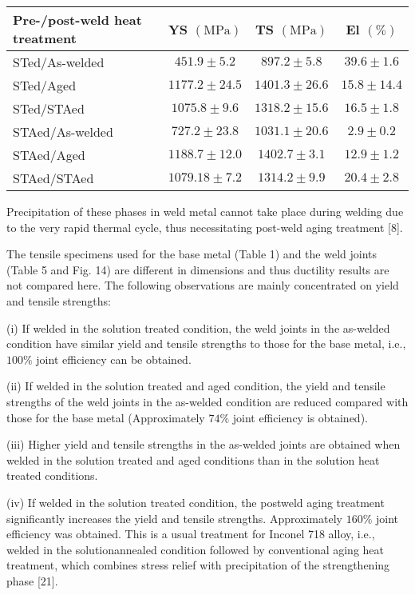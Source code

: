 \documentclass[10pt]{article}
\begin{document}
\begin{center}
\begin{tabular}{lccc}
\hline
Pre-/post-weld heat treatment & YS $(\mathrm{MPa})$ & TS $(\mathrm{MPa})$ & El $(\%)$ \\
\hline
STed/As-welded & $451.9 \pm 5.2$ & $897.2 \pm 5.8$ & $39.6 \pm 1.6$ \\
STed/Aged & $1177.2 \pm 24.5$ & $1401.3 \pm 26.6$ & $15.8 \pm 14.4$ \\
STed/STAed & $1075.8 \pm 9.6$ & $1318.2 \pm 15.6$ & $16.5 \pm 1.8$ \\
STAed/As-welded & $727.2 \pm 23.8$ & $1031.1 \pm 20.6$ & $2.9 \pm 0.2$ \\
STAed/Aged & $1188.7 \pm 12.0$ & $1402.7 \pm 3.1$ & $12.9 \pm 1.2$ \\
STAed/STAed & $1079.18 \pm 7.2$ & $1314.2 \pm 9.9$ & $20.4 \pm 2.8$ \\
\hline
\end{tabular}
\end{center}

Precipitation of these phases in weld metal cannot take place during welding due to the very rapid thermal cycle, thus necessitating post-weld aging treatment [8].

The tensile specimens used for the base metal (Table 1) and the weld joints (Table 5 and Fig. 14) are different in dimensions and thus ductility results are not compared here. The following observations are mainly concentrated on yield and tensile strengths:

(i) If welded in the solution treated condition, the weld joints in the as-welded condition have similar yield and tensile strengths to those for the base metal, i.e., $100 \%$ joint efficiency can be obtained.

(ii) If welded in the solution treated and aged condition, the yield and tensile strengths of the weld joints in the as-welded condition are reduced compared with those for the base metal (Approximately $74 \%$ joint efficiency is obtained).

(iii) Higher yield and tensile strengths in the as-welded joints are obtained when welded in the solution treated and aged conditions than in the solution heat treated conditions.

(iv) If welded in the solution treated condition, the postweld aging treatment significantly increases the yield and tensile strengths. Approximately $160 \%$ joint efficiency was obtained. This is a usual treatment for Inconel 718 alloy, i.e., welded in the solutionannealed condition followed by conventional aging heat treatment, which combines stress relief with precipitation of the strengthening phase [21].
\end{document}
